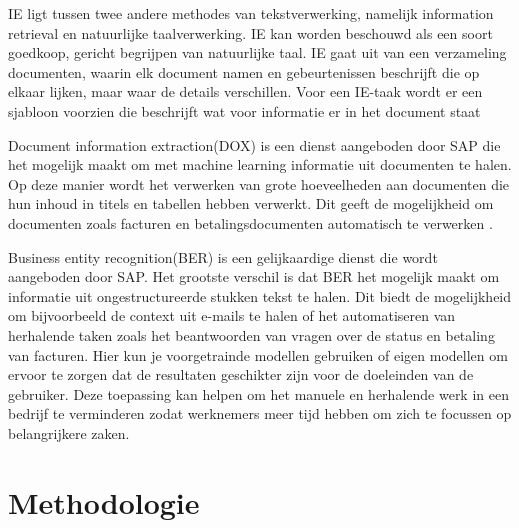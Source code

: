 IE ligt tussen twee andere methodes van tekstverwerking, namelijk information retrieval en natuurlijke taalverwerking. IE kan worden beschouwd als een soort goedkoop, gericht begrijpen van natuurlijke taal. IE gaat uit van een verzameling documenten, waarin elk document namen en gebeurtenissen beschrijft die op elkaar lijken, maar waar de details verschillen. Voor een IE-taak wordt er een sjabloon voorzien die beschrijft wat voor informatie er in het document staat \autocite{Freitag2000}

Document information extraction(DOX) is een dienst aangeboden door SAP die het mogelijk maakt om met machine learning informatie uit documenten te halen. Op deze manier wordt het verwerken van grote hoeveelheden aan documenten die hun inhoud in titels en tabellen hebben verwerkt. Dit geeft de mogelijkheid om documenten zoals facturen en betalingsdocumenten automatisch te verwerken \autocite{SAPDOX}.

Business entity recognition(BER) is een gelijkaardige dienst die wordt aangeboden door SAP. Het grootste verschil is dat BER het mogelijk maakt om informatie uit ongestructureerde stukken tekst te halen. Dit biedt de mogelijkheid om bijvoorbeeld de context uit e-mails te halen of het automatiseren van herhalende taken zoals het beantwoorden van vragen over de status en betaling van facturen. Hier kun je voorgetrainde modellen gebruiken of eigen modellen om ervoor te zorgen dat de resultaten geschikter zijn voor de doeleinden van de gebruiker. Deze toepassing kan helpen om het manuele en herhalende werk in een bedrijf te verminderen zodat werknemers meer tijd hebben om zich te focussen op belangrijkere zaken.
 \autocite{SAPBER}
\section{Methodologie}%
\label{sec:methodologie}

